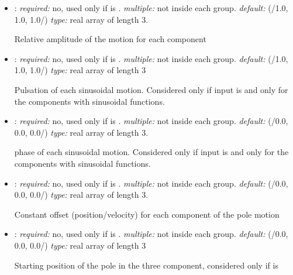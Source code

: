 \begin{itemize}
\begin{itemize}
    Collective amplitude of the motion, applied to all the three components of the motion    
    
     \item {}: \textit{required:} no, used only if  
     is . \textit{multiple:} not inside each  group. 
     \textit{default:} (/1.0, 1.0, 1.0/) \textit{type:} real array of length 3.
    
    Relative amplitude of the motion for each component
    
    \item {}: \textit{required:} no, used only if  
    is . \textit{multiple:} not inside each  group. 
    \textit{default:} (/1.0, 1.0, 1.0/) \textit{type:} real array of length 3
    
    Pulsation of each sinusoidal motion. Considered only if input is 
     and only for the components with sinusoidal functions.
    
    \item {}: \textit{required:} no, used only if  
    is . \textit{multiple:} not inside each  group. 
    \textit{default:} (/0.0, 0.0, 0.0/) \textit{type:} real array of length 3.
    
    phase of each sinusoidal motion. Considered only if input is  
    and only for the components with sinusoidal functions.
    
    \item {}: \textit{required:} no, used only if  
    is . \textit{multiple:} not inside each  group. 
    \textit{default:} (/0.0, 0.0, 0.0/) \textit{type:} real array of length 3.
    
    Constant offset (position/velocity) for each component of the pole motion
    
    \item {}: \textit{required:} no, used only if  
    is . \textit{multiple:} not inside each  group. 
    \textit{default:} (/0.0, 0.0, 0.0/) \textit{type:} real array of length 3
    
    Starting position of the pole in the three component, considered only if 
     is 
    
    \end{itemize}


\end{itemize}
